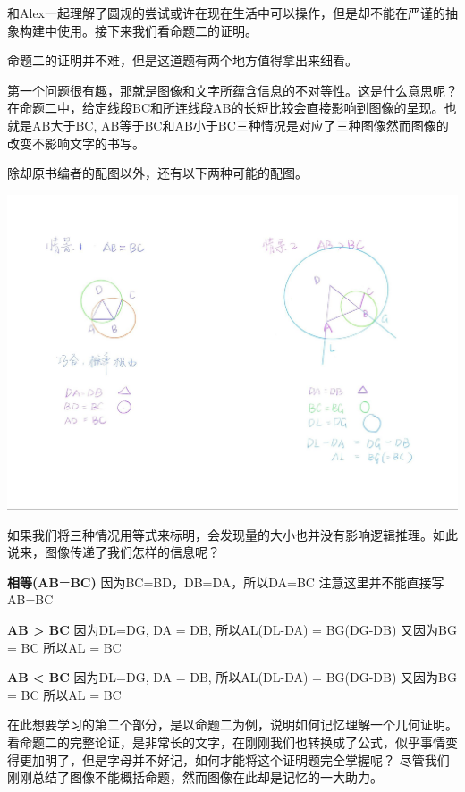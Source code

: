 \documentclass[
]{book}
\begin{document}
和Alex一起理解了圆规的尝试或许在现在生活中可以操作，但是却不能在严谨的抽象构建中使用。接下来我们看命题二的证明。

命题二的证明并不难，但是这道题有两个地方值得拿出来细看。

第一个问题很有趣，那就是图像和文字所蕴含信息的不对等性。这是什么意思呢？在命题二中，给定线段BC和所连线段AB的长短比较会直接影响到图像的呈现。也就是AB大于BC, AB等于BC和AB小于BC三种情况是对应了三种图像然而图像的改变不影响文字的书写。

除却原书编者的配图以外，还有以下两种可能的配图。

\includegraphics[width=1\linewidth]{./image/02-prop2-image1}

如果我们将三种情况用等式来标明，会发现量的大小也并没有影响逻辑推理。如此说来，图像传递了我们怎样的信息呢？

\textbf{相等(AB=BC)}
因为BC=BD，DB=DA，所以DA=BC
注意这里并不能直接写AB=BC

\textbf{AB \textgreater{} BC}
因为DL=DG, DA = DB, 所以AL(DL-DA) = BG(DG-DB)
又因为BG = BC
所以AL = BC

\textbf{AB \textless{} BC}
因为DL=DG, DA = DB, 所以AL(DL-DA) = BG(DG-DB)
又因为BG = BC
所以AL = BC

在此想要学习的第二个部分，是以命题二为例，说明如何记忆理解一个几何证明。看命题二的完整论证，是非常长的文字，在刚刚我们也转换成了公式，似乎事情变得更加明了，但是字母并不好记，如何才能将这个证明题完全掌握呢？ 尽管我们刚刚总结了图像不能概括命题，然而图像在此却是记忆的一大助力。
\end{document}
